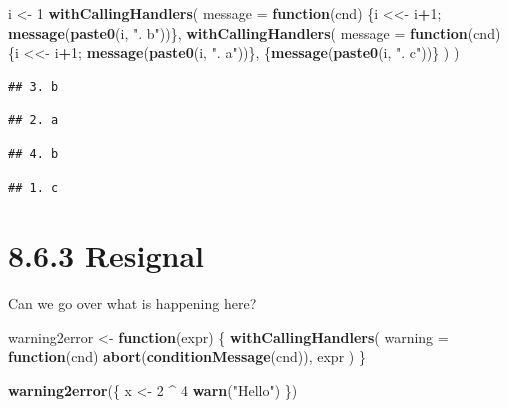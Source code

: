 \documentclass[]{book}
\newenvironment{Shaded}{\begin{snugshade}}{\end{snugshade}}
\newcommand{\ControlFlowTok}[1]{\textcolor[rgb]{0.13,0.29,0.53}{\textbf{#1}}}
\newcommand{\DataTypeTok}[1]{\textcolor[rgb]{0.13,0.29,0.53}{#1}}
\newcommand{\DecValTok}[1]{\textcolor[rgb]{0.00,0.00,0.81}{#1}}
\newcommand{\KeywordTok}[1]{\textcolor[rgb]{0.13,0.29,0.53}{\textbf{#1}}}
\newcommand{\NormalTok}[1]{#1}
\newcommand{\OperatorTok}[1]{\textcolor[rgb]{0.81,0.36,0.00}{\textbf{#1}}}
\newcommand{\StringTok}[1]{\textcolor[rgb]{0.31,0.60,0.02}{#1}}
\begin{document}
\begin{Shaded}
\begin{Highlighting}[]
\NormalTok{i <-}\StringTok{ }\DecValTok{1}
\KeywordTok{withCallingHandlers}\NormalTok{(}
  \DataTypeTok{message =} \ControlFlowTok{function}\NormalTok{(cnd) \{i <<-}\StringTok{ }\NormalTok{i}\OperatorTok{+}\DecValTok{1}\NormalTok{; }\KeywordTok{message}\NormalTok{(}\KeywordTok{paste0}\NormalTok{(i, }\StringTok{". b"}\NormalTok{))\},}
  \KeywordTok{withCallingHandlers}\NormalTok{(}
    \DataTypeTok{message =} \ControlFlowTok{function}\NormalTok{(cnd) \{i <<-}\StringTok{ }\NormalTok{i}\OperatorTok{+}\DecValTok{1}\NormalTok{; }\KeywordTok{message}\NormalTok{(}\KeywordTok{paste0}\NormalTok{(i, }\StringTok{". a"}\NormalTok{))\},}
\NormalTok{    \{}\KeywordTok{message}\NormalTok{(}\KeywordTok{paste0}\NormalTok{(i, }\StringTok{". c"}\NormalTok{))\}}
\NormalTok{  )}
\NormalTok{)}
\end{Highlighting}
\end{Shaded}

\begin{verbatim}
## 3. b
\end{verbatim}

\begin{verbatim}
## 2. a
\end{verbatim}

\begin{verbatim}
## 4. b
\end{verbatim}

\begin{verbatim}
## 1. c
\end{verbatim}

\hypertarget{resignal}{%
\section*{8.6.3 Resignal}\label{resignal}}

Can we go over what is happening here?

\begin{Shaded}
\begin{Highlighting}[]
\NormalTok{warning2error <-}\StringTok{ }\ControlFlowTok{function}\NormalTok{(expr) \{}
  \KeywordTok{withCallingHandlers}\NormalTok{(}
    \DataTypeTok{warning =} \ControlFlowTok{function}\NormalTok{(cnd) }\KeywordTok{abort}\NormalTok{(}\KeywordTok{conditionMessage}\NormalTok{(cnd)),}
\NormalTok{    expr}
\NormalTok{  )}
\NormalTok{\}}

\KeywordTok{warning2error}\NormalTok{(\{}
\NormalTok{  x <-}\StringTok{ }\DecValTok{2} \OperatorTok{^}\StringTok{ }\DecValTok{4}
  \KeywordTok{warn}\NormalTok{(}\StringTok{"Hello"}\NormalTok{)}
\NormalTok{\})}
\end{Highlighting}
\end{Shaded}
\end{document}
